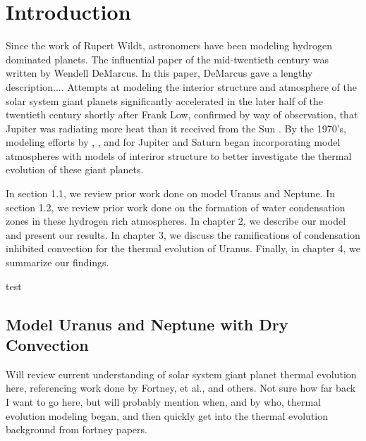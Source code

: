 \documentclass[11pt]{ucscthesisbs}
\begin{document}
\chapter{Introduction}
Since the work of Rupert Wildt\citep{wildt_1947}, astronomers have been modeling hydrogen dominated planets. The influential paper of the mid-twentieth century was written by Wendell DeMarcus\citep{demarcus_1958}. In this paper, DeMarcus gave a lengthy description.... Attempts at modeling the interior structure and atmosphere of the solar system giant planets significantly accelerated in the later half of the twentieth century shortly after Frank Low, confirmed by way of observation, that Jupiter was radiating more heat than it received from the Sun \citep{low_1966}. By the 1970's, modeling efforts by \citep{graboske_1975}, \citep{hubbard_1977}, and \citep{pollack_1977} for Jupiter and Saturn began incorporating model atmospheres with models of interiror structure to better investigate the thermal evolution of these giant planets. 


In section 1.1, we review prior work done on model Uranus and Neptune. In section 1.2, we review prior work done on the formation of water condensation zones in these hydrogen rich atmospheres. In chapter 2, we describe our model and present our results. In chapter 3, we discuss the ramifications of condensation inhibited convection for the thermal evolution of Uranus. Finally, in chapter 4, we summarize our findings.\citep{friedson_2017} \citep{leconte_2017} \citep{pollack_1977}\citep{fortney_2011} \citep{graboske_1975} \citep{guillot_2019} \citep{guillot_1995}

test

\section{Model Uranus and Neptune with Dry Convection}\label{model_atmosphere_background}

Will review current understanding of solar system giant planet thermal evolution here, referencing work done by Fortney, et al., and others. Not sure how far back I want to go here, but will probably mention when, and by who, thermal evolution modeling began, and then quickly get into the thermal evolution background from fortney papers.
\end{document}
